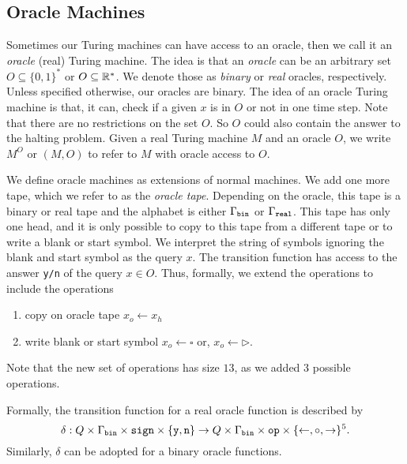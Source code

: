 \documentclass{article}
\begin{document}
\subsection{Oracle Machines}
\label{sec:OracleDefinition}

Sometimes our Turing machines can have access to an oracle, 
then we call it an \emph{oracle} (real) Turing machine. 
The idea is that an \textit{oracle} can be an arbitrary set $O\subseteq \{0,1\}^*$ 
or $O\subseteq \mathbb{R}^*$.
We denote those as \textit{binary} or \textit{real} oracles, respectively.
Unless specified otherwise, our oracles are binary.
The idea of an oracle Turing machine is that, it can, check if a given $x$ is in $O$ or not in one time step.
Note that there are no restrictions on the set $O$.
So $O$ could also contain the answer to the halting problem.
Given a real Turing machine $M$ and an oracle $O$, we write $M^O$ or $(M,O)$ to refer to $M$ with oracle access to $O$.

\begin{definition}
    \label{def:OracleRTM}
    We define oracle machines as extensions of normal machines.
    We add one more tape, which we refer to as the \textit{oracle tape}.
    Depending on the oracle, this tape is a binary or real tape and the alphabet is either
    $\Gamma_\texttt{bin}$ or $\Gamma_\texttt{real}$. 
    This tape has only one head, and it is only possible to copy to this tape from a different tape or to write a blank or start symbol.
    We interpret the string of symbols ignoring the blank and start symbol as the query $x$.
    The transition function has access to the answer \texttt{y/n} of the query $x\in O$.
    Thus, formally, we extend the operations \operations to include the operations
    \begin{enumerate}
        \item copy on oracle tape $x_o \leftarrow x_h$
        \item write blank or start symbol $x_o \leftarrow \square$ or, $x_o \leftarrow \rhd$.
    \end{enumerate}
    Note that the new set of operations has size $13$, as we added 3 possible operations.
    
    Formally, the transition function for a real oracle function is described by
    \[\delta : Q \times \Gamma_\texttt{bin} \times \texttt{sign} \times \{\texttt{y},\texttt{n}\} \rightarrow Q \times \Gamma_\texttt{bin} \times \texttt{op} \times \{\leftarrow, \circ, \rightarrow\}^5.\]
    Similarly, $\delta$ can be adopted for a binary oracle functions.
    
\end{definition}
\end{document}
